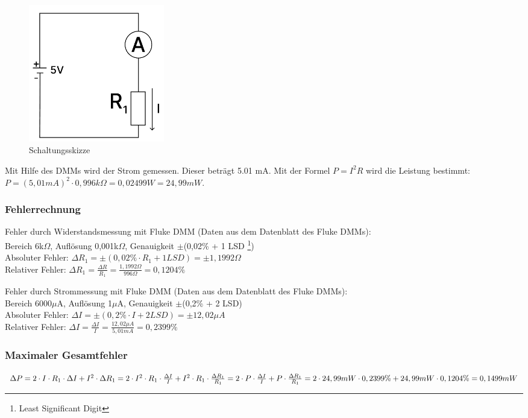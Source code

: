 \begin{figure}[H]
	\centering
	\includegraphics[height=6cm]{images/Versuch3/Versuch3_1_Schaltskizze.pdf} 
	\caption{Schaltungsskizze}
	\label{fig: Schaltungsskizze Versuch 3}
\end{figure}

Mit Hilfe des DMMs wird der Strom gemessen. Dieser beträgt 5.01 mA. Mit der
Formel $P = I^{2}R$ wird die Leistung bestimmt:
$P=(5,01 mA)^{2}\cdot 0,996 k\Omega = 0,02499 W = 24,99mW$.

\subsubsection{Fehlerrechnung}
Fehler durch Widerstandsmessung mit Fluke DMM (Daten aus dem Datenblatt des Fluke DMMs):\\
Bereich 6k$\Omega$, Auflösung 0,001k$\Omega$, Genauigkeit $\pm$(0,02\% + 1 LSD \footnote{Least Significant Digit})\\
Absoluter Fehler: $\Delta R_1 = \pm (0,02\% \cdot R_1 + 1 LSD) = \pm 1,1992 \Omega$\\
Relativer Fehler: $\Delta R_1 = \frac{\Delta R}{R_1} = \frac{1,1992 \Omega}{996 \Omega} = 0,1204\%$\par


Fehler durch Strommessung mit Fluke DMM (Daten aus dem Datenblatt des Fluke DMMs):\\
Bereich 6000$\mu$A, Auflösung 1$\mu$A, Genauigkeit $\pm$(0,2\% + 2 LSD)\\
Absoluter Fehler: $\Delta I = \pm (0,2\% \cdot I + 2 LSD) = \pm 12,02 \mu A$\\
Relativer Fehler: $\Delta I = \frac{\Delta I}{I} = \frac{12,02 \mu A}{5,01 mA} = 0,2399\%$\\

\subsubsection{Maximaler Gesamtfehler}
$\Delta P = 2 \cdot I \cdot R_1 \cdot \Delta I + I^2 \cdot \Delta R_1 = 
2 \cdot I^2 \cdot R_1 \cdot \frac{\Delta I}{I} + I^2 \cdot R_1 \cdot \frac{\Delta R_1}{R_1} =
2 \cdot P \cdot \frac{\Delta I}{I} + P \cdot \frac{\Delta R_1}{R_1} = \\
2 \cdot 24,99 mW \cdot 0,2399\% + 24,99 mW \cdot 0,1204\% = 0,1499 mW $

